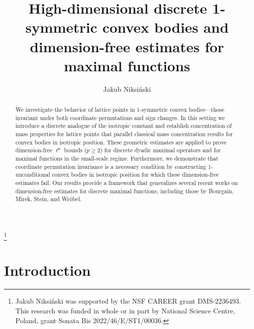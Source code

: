 \documentclass[a4paper,oneside, reqno]{amsart}
\title[High-dimensional discrete 1-symmetric convex bodies]{High-dimensional discrete 1-symmetric convex bodies and dimension-free estimates for maximal functions}
\author{Jakub Niksi\'nski}
\numberwithin{equation}{section}
\theoremstyle{definition}%
\theoremstyle{definition}
\theoremstyle{definition}%
\theoremstyle{definition}
\begin{document}
\begin{abstract}
We investigate the behavior of lattice points in 1-symmetric convex bodies—those invariant under both coordinate permutations and sign changes. In this setting we introduce a discrete analogue of the isotropic constant and establish concentration of mass properties for lattice points that parallel classical mass concentration results for convex bodies in isotropic position. These geometric estimates are applied to prove dimension-free $\ell^p$ bounds ($p \ge 2$) for discrete dyadic maximal operators and for maximal functions in the small-scale regime. Furthermore, we demonstrate that coordinate permutation invariance is a necessary condition by constructing 1-unconditional convex bodies in isotropic position for which these dimension-free estimates fail. Our results provide a framework that generalizes several recent works on dimension-free estimates for discrete maximal functions, including those by Bourgain, Mirek, Stein, and Wróbel.



\end{abstract}
\thanks{Jakub Niksiński was supported by the NSF CAREER grant DMS-2236493. This research was funded in whole or in part by National Science Centre, Poland, grant Sonata Bis 2022/46/E/ST1/00036.}


\maketitle
\tableofcontents
\section{Introduction}
\end{document}
